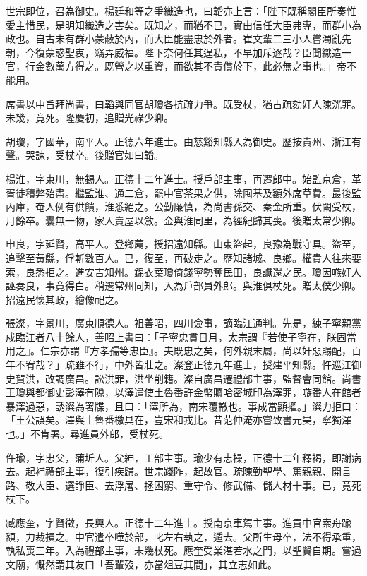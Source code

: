 \begin{pinyinscope}
世宗即位，召為御史。楊廷和等之爭織造也，曰韜亦上言：「陛下既稱閣臣所奏惟愛主惜民，是明知織造之害矣。既知之，而猶不已，實由信任大臣弗專，而群小為政也。自古未有群小蒙蔽於內，而大臣能盡忠於外者。崔文輩二三小人嘗濁亂先朝，今復蒙惑聖衷，竊弄威福。陛下奈何任其逞私，不早加斥逐哉？臣聞織造一官，行金數萬方得之。既營之以重資，而欲其不責償於下，此必無之事也。」帝不能用。

席書以中旨拜尚書，曰韜與同官胡瓊各抗疏力爭。既受杖，猶占疏劾奸人陳洸罪。未幾，竟死。隆慶初，追贈光祿少卿。

胡瓊，字國華，南平人。正德六年進士。由慈谿知縣入為御史。歷按貴州、浙江有聲。哭諫，受杖卒。後贈官如曰韜。

楊淮，字東川，無錫人。正德十二年進士。授戶部主事，再遷郎中。始監京倉，革胥徒積弊殆盡。繼監淮、通二倉，罷中官茶果之供，除囤基及額外席草費。最後監內庫，奄人例有供饋，淮悉絕之。公勤廉慎，為尚書孫交、秦金所重。伏闕受杖，月餘卒。囊無一物，家人賣屋以斂。金與淮同里，為經紀歸其喪。後贈太常少卿。

申良，字延賢，高平人。登鄉薦，授招遠知縣。山東盜起，良豫為戰守具。盜至，追擊至黃縣，俘斬數百人。已，復至，再破走之。歷知諸城、良鄉。權貴人往來要索，良悉拒之。進安吉知州。錦衣葉瓊倚錢寧勢奪民田，良讞還之民。瓊因嗾奸人誣奏良，事竟得白。稍遷常州同知，入為戶部員外郎。與淮俱杖死。贈太僕少卿。招遠民懷其政，繪像祀之。

張澯，字景川，廣東順德人。祖善昭，四川僉事，謫臨江通判。先是，練子寧親黨戍臨江者八十餘人，善昭上書曰：「子寧忠貫日月，太宗謂『若使子寧在，朕固當用之』。仁宗亦謂『方孝孺等忠臣』。夫既忠之矣，何外親末屬，尚以奸惡賜配，百年不宥哉？」疏雖不行，中外皆壯之。澯登正德九年進士，授建平知縣。忤巡江御史賀洪，改調廣昌。訟洪罪，洪坐削籍。澯自廣昌遷禮部主事，監督會同館。尚書王瓊與都御史彭澤有隙，以澤遣使土魯番許金幣贖哈密城印為澤罪，嗾番人在館者暴澤過惡，誘澯為署牒，且曰：「澤所為，南宋覆轍也。事成當顯擢。」澯力拒曰：「王公誤矣。澤與土魯番檄具在，豈宋和戎比。昔范仲淹亦嘗致書元昊，寧獨澤也。」不肯署。尋進員外郎，受杖死。

仵瑜，字忠父，蒲圻人。父紳，工部主事。瑜少有志操，正德十二年釋褐，即謝病去。起補禮部主事，復引疾歸。世宗踐阼，起故官。疏陳勤聖學、篤親親、開言路、敬大臣、選諍臣、去浮屠、拯困窮、重守令、修武備、儲人材十事。已，竟死杖下。

臧應奎，字賢徵，長興人。正德十二年進士。授南京車駕主事。進貢中官索舟踰額，力裁損之。中官遣卒嘩於部，叱左右執之，遁去。父所生母卒，法不得承重，執私喪三年。入為禮部主事，未幾杖死。應奎受業湛若水之門，以聖賢自期。嘗過文廟，慨然謂其友曰「吾輩歿，亦當俎豆其間」，其立志如此。


\end{pinyinscope}
